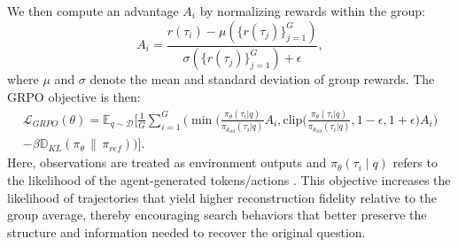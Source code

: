 We then compute an advantage $A_i$ by normalizing rewards within the group:
\begin{equation}
    A_i = \frac{r(\tau_i) - \mu(\{r(\tau_j)\}_{j=1}^G)}{\sigma(\{r(\tau_j)\}_{j=1}^G) + \epsilon},
\end{equation}
where $\mu$ and $\sigma$ denote the mean and standard deviation of group rewards. The GRPO objective is then:
\begin{equation}
\begin{aligned}
\mathcal{L}_{GRPO}(\theta)
= \mathbb{E}_{q \sim \mathcal{D}} \Bigg[
\frac{1}{G} \sum_{i=1}^G
\Big(
\min \Big(
\frac{\pi_\theta(\tau_i|q)}{\pi_{\theta_{old}}(\tau_i|q)} A_i,
\text{clip}\Big(
\frac{\pi_\theta(\tau_i|q)}{\pi_{\theta_{old}}(\tau_i|q)},
1-\epsilon, 1+\epsilon
\Big) A_i
\Big)
\\
- \beta \mathbb{D}_{KL}(\pi_\theta \,\|\, \pi_{ref})
\Big)
\Bigg].
\end{aligned}
\end{equation}
Here, observations are treated as environment outputs and $\pi_\theta(\tau_i\mid q)$ refers to the likelihood of the agent-generated tokens/actions \citep{search-r1}.
This objective increases the likelihood of trajectories that yield higher reconstruction fidelity relative to the group average, thereby encouraging search behaviors that better preserve the structure and information needed to recover the original question.